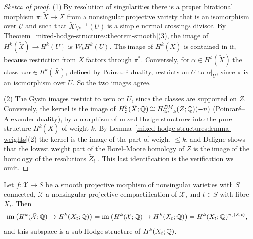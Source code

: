 \begin{proof}[Sketch of proof]
(1) By resolution of singularities there is a proper birational morphism $\pi \colon \tilde X \to \bar X$ from a nonsingular projective variety that is an isomorphism over $U$ and such that
$\tilde X \setminus \pi^{-1}(U)$ is a simple normal crossings divisor. By Theorem~\ref{mixed-hodge-structures:theorem-smooth}(3), the image of $H^k(\tilde X) \to H^k(U)$ is $W_kH^k(U)$. The image of
$H^k(\bar X)$ is contained in it, because restriction from $\bar X$ factors through $\pi^*$. Conversely, for $\alpha \in H^k(\tilde X)$ the class $\pi_*\alpha \in H^k(\bar X)$, defined by Poincar\'e duality,
restricts on $U$ to $\alpha|_U$, since $\pi$ is an isomorphism over $U$. So the two images agree.

(2) The Gysin images restrict to zero on $U$, since the classes are supported on $Z$. Conversely, the kernel is the image of $H^k_Z(\bar X; \mathbb{Q}) \cong H^{BM}_{2n-k}(Z; \mathbb{Q})(-n)$ (Poincar\'e--Alexander
duality), by a morphism of mixed Hodge structures into the pure structure $H^k(\bar X)$ of weight $k$. By Lemma~\ref{mixed-hodge-structures:lemma-weights}(2) the kernel is the image of the part of weight
$\leq k$, and Deligne shows that the lowest weight part of the Borel--Moore homology of $Z$ is the image of the homology of the resolutions $\tilde Z_i$ \cite{deligne-hodge-3}. This last
identification is the verification we omit.
\end{proof}

\begin{theorem}\label{mixed-hodge-structures:theorem-global-invariant}
Let $f \colon \mathcal{X} \to S$ be a smooth projective morphism of nonsingular varieties with $S$ connected, $\bar{\mathcal{X}}$ a nonsingular projective compactification of $\mathcal{X}$, and $t \in S$ with
fibre $X_t$. Then
\[
\operatorname{im}\big(H^k(\bar{\mathcal{X}}; \mathbb{Q}) \to H^k(X_t; \mathbb{Q})\big) = \operatorname{im}\big(H^k(\mathcal{X}; \mathbb{Q}) \to H^k(X_t; \mathbb{Q})\big) = H^k(X_t; \mathbb{Q})^{\pi_1(S, t)},
\]
and this subspace is a sub-Hodge structure of $H^k(X_t; \mathbb{Q})$.
\end{theorem}


